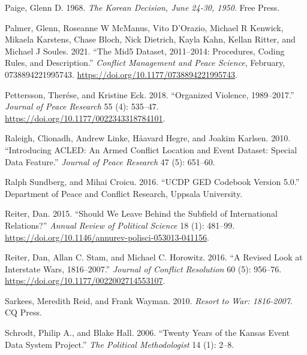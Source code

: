 \documentclass{article}
\newlength{\cslhangindent}
\newlength{\cslentryspacingunit} %
\newenvironment{CSLReferences}[2] %
 {%
  \setlength{\parindent}{0pt}
  \ifodd #1
  \let\oldpar\par
  \def\par{\hangindent=\cslhangindent\oldpar}
  \fi
  \setlength{\parskip}{#2\cslentryspacingunit}
 }%
 {}
\begin{document}
\begin{CSLReferences}{1}{0}
\leavevmode{}%
Paige, Glenn D. 1968. \emph{The {Korean Decision}, {June} 24-30, 1950}.
{Free Press}.

\leavevmode{}%
Palmer, Glenn, Roseanne W McManus, Vito D'Orazio, Michael R Kenwick,
Mikaela Karstens, Chase Bloch, Nick Dietrich, Kayla Kahn, Kellan Ritter,
and Michael J Soules. 2021. {``The {Mid5 Dataset}, 2011--2014:
{Procedures}, Coding Rules, and Description.''} \emph{Conflict
Management and Peace Science}, February, 0738894221995743.
\url{https://doi.org/10.1177/0738894221995743}.

\leavevmode{}%
Pettersson, Therése, and Kristine Eck. 2018. {``Organized Violence,
1989--2017.''} \emph{Journal of Peace Research} 55 (4): 535--47.
\url{https://doi.org/10.1177/0022343318784101}.

\leavevmode{}%
Raleigh, Clionadh, Andrew Linke, Håavard Hegre, and Joakim Karlsen.
2010. {``Introducing {ACLED}: An Armed Conflict Location and Event
Dataset: Special Data Feature.''} \emph{Journal of Peace Research} 47
(5): 651--60.

\leavevmode{}%
Ralph Sundberg, and Mihai Croicu. 2016. {``{UCDP GED Codebook} Version
5.0.''} {Department of Peace and Conflict Research, Uppsala University}.

\leavevmode{}%
Reiter, Dan. 2015. {``Should {We Leave Behind} the {Subfield} of
{International Relations}?''} \emph{Annual Review of Political Science}
18 (1): 481--99.
\url{https://doi.org/10.1146/annurev-polisci-053013-041156}.

\leavevmode{}%
Reiter, Dan, Allan C. Stam, and Michael C. Horowitz. 2016. {``A {Revised
Look} at {Interstate Wars}, 1816--2007.''} \emph{Journal of Conflict
Resolution} 60 (5): 956--76.
\url{https://doi.org/10.1177/0022002714553107}.

\leavevmode{}%
Sarkees, Meredith Reid, and Frank Wayman. 2010. \emph{Resort to War:
1816-2007}. {CQ Press}.

\leavevmode{}%
Schrodt, Philip A., and Blake Hall. 2006. {``Twenty Years of the
{Kansas} Event Data System Project.''} \emph{The Political
Methodologist} 14 (1): 2--8.


\end{CSLReferences}
\end{document}
